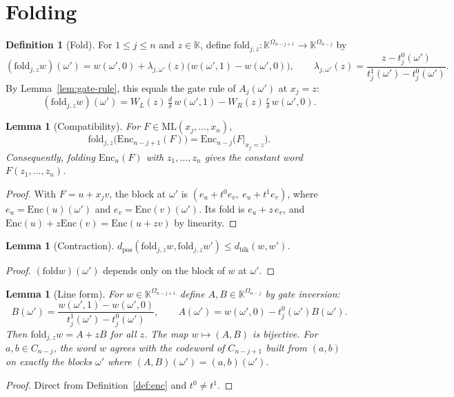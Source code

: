 \documentclass[11pt]{article}
\newtheorem{lemma}[theorem]{Lemma}
\theoremstyle{definition}
\newtheorem{definition}[theorem]{Definition}
\newcommand{\K}{\mathbb{K}}
\newcommand{\ML}{\mathrm{ML}}
\newcommand{\Enc}{\mathrm{Enc}}
\newcommand{\fold}{\mathrm{fold}}
\newcommand{\dpos}{d_{\mathrm{pos}}}
\newcommand{\dblk}{d_{\mathrm{blk}}}
\begin{document}
\section{Folding}

\begin{definition}[Fold]
For $1\le j\le n$ and $z\in\K$, define $\fold_{j,z}:\K^{\Omega_{n-j+1}}\to\K^{\Omega_{n-j}}$ by
\[
(\fold_{j,z}w)(\omega')=w(\omega',0)+\lambda_{j,\omega'}(z)\bigl(w(\omega',1)-w(\omega',0)\bigr),
\qquad
\lambda_{j,\omega'}(z)=\frac{z-t_j^0(\omega')}{t_j^1(\omega')-t_j^0(\omega')}.
\]
By Lemma~\ref{lem:gate-rule}, this equals the gate rule of $A_j(\omega')$ at $x_j=z$:
\[
(\fold_{j,z}w)(\omega')=W_L(z)\,\tfrac{d}{\delta}\,w(\omega',1)-W_R(z)\,\tfrac{c}{\delta}\,w(\omega',0).
\]
\end{definition}

\begin{lemma}[Compatibility]\label{lem:compat}
For $F\in\ML(x_j,\dots,x_n)$,
\[
\fold_{j,z}\bigl(\Enc_{n-j+1}(F)\bigr)=\Enc_{n-j}\bigl(F|_{x_j=z}\bigr).
\]
Consequently, folding $\Enc_n(F)$ with $z_1,\dots,z_n$ gives the constant word $F(z_1,\dots,z_n)$.
\end{lemma}
\begin{proof}
With $F=u+x_jv$, the block at $\omega'$ is $(e_u+t^0e_v,\ e_u+t^1e_v)$, where
$e_u=\Enc(u)(\omega')$ and $e_v=\Enc(v)(\omega')$. Its fold is $e_u+z\,e_v$, and
$\Enc(u)+z\Enc(v)=\Enc(u+zv)$ by linearity.
\end{proof}

\begin{lemma}[Contraction]\label{lem:contract}
$\dpos(\fold_{j,z}w,\fold_{j,z}w')\le\dblk(w,w')$.
\end{lemma}
\begin{proof}
$(\fold w)(\omega')$ depends only on the block of $w$ at $\omega'$.
\end{proof}

\begin{lemma}[Line form]\label{lem:line}
For $w\in\K^{\Omega_{n-j+1}}$ define $A,B\in\K^{\Omega_{n-j}}$ by gate inversion:
\[
B(\omega')=\frac{w(\omega',1)-w(\omega',0)}{t_j^1(\omega')-t_j^0(\omega')},\qquad
A(\omega')=w(\omega',0)-t_j^0(\omega')B(\omega').
\]
Then $\fold_{j,z}w=A+zB$ for all $z$. The map $w\mapsto(A,B)$ is bijective. For $a,b\in C_{n-j}$,
the word $w$ agrees with the codeword of $C_{n-j+1}$ built from $(a,b)$ on exactly the blocks
$\omega'$ where $(A,B)(\omega')=(a,b)(\omega')$.
\end{lemma}
\begin{proof}
Direct from Definition~\ref{def:enc} and $t^0\neq t^1$.
\end{proof}
\end{document}
